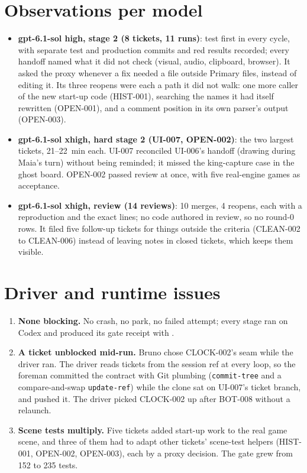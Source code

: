 \documentclass[11pt,a4paper]{article}
\begin{document}
\section*{Observations per model}

\begin{itemize}
  \item \textbf{gpt-6.1-sol high, stage 2 (8 tickets, 11 runs)}: test first in every cycle,
        with separate test and production commits and red results recorded; every handoff
        named what it did not check (visual, audio, clipboard, browser). It asked the proxy
        whenever a fix needed a file outside Primary files, instead of editing it. Its three
        reopens were each a path it did not walk: one more caller of the new start-up code
        (HIST-001), searching the names it had itself rewritten (OPEN-001), and a comment
        position in its own parser's output (OPEN-003).
  \item \textbf{gpt-6.1-sol xhigh, hard stage 2 (UI-007, OPEN-002)}: the two largest
        tickets, 21--22~min each. UI-007 reconciled UI-006's handoff (drawing during Maia's
        turn) without being reminded; it missed the king-capture case in the ghost board.
        OPEN-002 passed review at once, with five real-engine games as acceptance.
  \item \textbf{gpt-6.1-sol xhigh, review (14 reviews)}: 10 merges, 4 reopens, each with a
        reproduction and the exact lines; no code authored in review, so no round-0 rows. It
        filed five follow-up tickets for things outside the criteria (CLEAN-002 to CLEAN-006)
        instead of leaving notes in closed tickets, which keeps them visible.
\end{itemize}

\section*{Driver and runtime issues}

\begin{enumerate}
  \item \textbf{None blocking.} No crash, no park, no failed attempt; every stage ran on
        Codex and produced its gate receipt with .
  \item \textbf{A ticket unblocked mid-run.} Bruno chose CLOCK-002's seam while the driver
        ran. The driver reads tickets from the session ref at every loop, so the foreman
        committed the contract with Git plumbing (\texttt{commit-tree} and a compare-and-swap
        \texttt{update-ref}) while the clone sat on UI-007's ticket branch, and pushed it. The
        driver picked CLOCK-002 up after BOT-008 without a relaunch.
  \item \textbf{Scene tests multiply.} Five tickets added start-up work to the real game
        scene, and three of them had to adapt other tickets' scene-test helpers (HIST-001,
        OPEN-002, OPEN-003), each by a proxy decision. The gate grew from 152 to 235 tests.
\end{enumerate}
\end{document}
